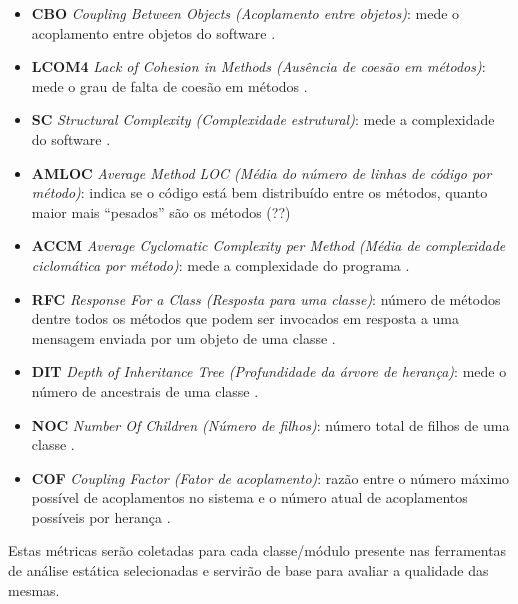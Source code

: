 \documentclass[qual, classic, a4paper]{ufbathesis}
\begin{document}
\begin{itemize}

  \item {\bf CBO} {\it Coupling Between Objects (Acoplamento entre objetos)}:
    mede o acoplamento entre objetos do software \cite{Chidamber1994}.

  \item {\bf LCOM4} {\it Lack of Cohesion in Methods (Ausência de coesão em
    métodos)}: mede o grau de falta de coesão em métodos \cite{Hitz1995}.

  \item {\bf SC} {\it Structural Complexity (Complexidade estrutural)}: mede a
    complexidade do software \cite{Darcy2005}.

  \item {\bf AMLOC} {\it Average Method LOC (Média do número de linhas de
    código por método)}: indica se o código está bem distribuído entre os
    métodos, quanto maior mais ``pesados'' são os métodos (??)

  \item {\bf ACCM} {\it Average Cyclomatic Complexity per Method (Média de
    complexidade ciclomática por método)}: mede a complexidade do programa
    \cite{McCabe1976}.

  \item {\bf RFC} {\it Response For a Class (Resposta para uma classe)}:
    número de métodos dentre todos os métodos que podem ser invocados em
    resposta a uma mensagem enviada por um objeto de uma classe
    \cite{Sharble1993}.

  \item {\bf DIT} {\it Depth of Inheritance Tree (Profundidade da árvore de
    herança)}: mede o número de ancestrais de uma classe \cite{Shih1997}.

  \item {\bf NOC} {\it Number Of Children (Número de filhos)}: número total de
    filhos de uma classe \cite{Rosenberg1997}.

  \item {\bf COF} {\it Coupling Factor (Fator de acoplamento)}: razão entre o
    número máximo possível de acoplamentos no sistema e o número atual de
    acoplamentos possíveis por herança \cite{Harrison1998}.

\end{itemize}

Estas métricas serão coletadas para cada classe/módulo presente nas
ferramentas de análise estática selecionadas e servirão de base para
avaliar a qualidade das mesmas.
\end{document}
